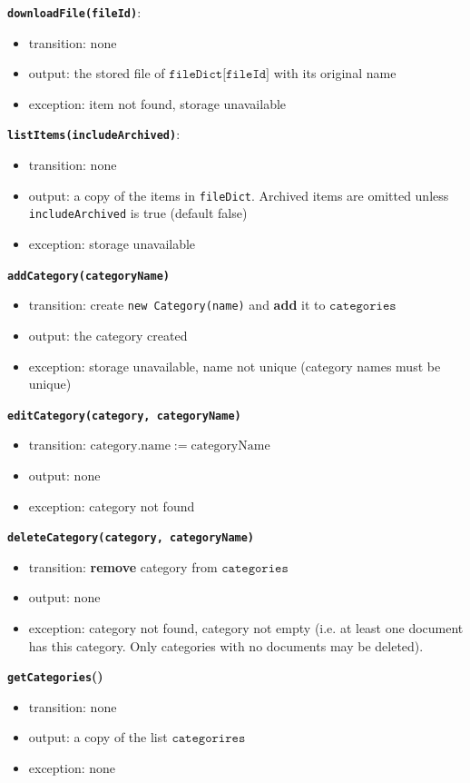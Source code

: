 \documentclass[12pt, titlepage]{article}
\begin{document}
\textbf{\texttt{downloadFile(fileId)}}:
\begin{itemize}
  \item transition: none
  \item output: the stored file of $\texttt{fileDict[fileId]}$ with its original name
  \item exception: item not found, storage unavailable
\end{itemize}

\textbf{\texttt{listItems(includeArchived)}}:
\begin{itemize}
  \item transition: none
  \item output: a copy of the items in \texttt{fileDict}. Archived items are omitted unless \texttt{includeArchived} is true (default false)
  \item exception: storage unavailable
\end{itemize}

\textbf{\texttt{addCategory(categoryName)}}
\begin{itemize}
  \item transition: create \texttt{new Category(name)} and \textbf{add} it to $\texttt{categories}$
  \item output: the category created
  \item exception: storage unavailable, name not unique (category names must be unique)
\end{itemize}

\textbf{\texttt{editCategory(category, categoryName)}}
\begin{itemize}
  \item transition: $\text{category}.\text{name} := \text{categoryName}$
  \item output: none
  \item exception: category not found
\end{itemize}

\textbf{\texttt{deleteCategory(category, categoryName)}}
\begin{itemize}
  \item transition: \textbf{remove} category from $\texttt{categories}$
  \item output: none
  \item exception: category not found, category not empty (i.e. at least one document has this category. Only categories with no documents may be deleted).
\end{itemize}

\textbf{\texttt{getCategories}()}
\begin{itemize}
  \item transition: none
  \item output: a copy of the list $\texttt{categorires}$
  \item exception: none
\end{itemize}
\end{document}
